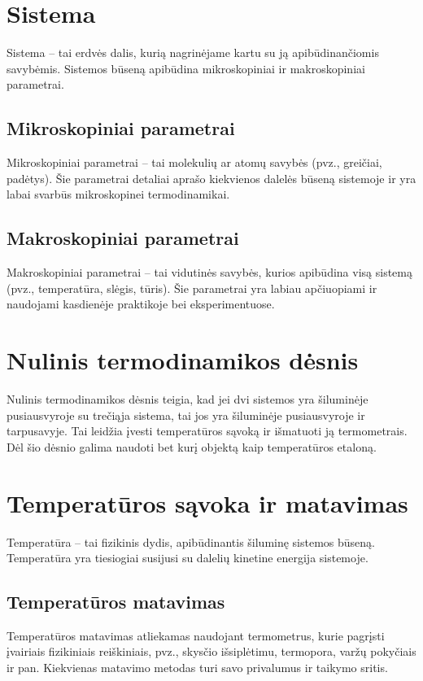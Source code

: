 \documentclass[a4paper,12pt]{article}
\begin{document}
\section{Sistema}

Sistema – tai erdvės dalis, kurią nagrinėjame kartu su ją apibūdinančiomis savybėmis. Sistemos būseną apibūdina mikroskopiniai ir makroskopiniai parametrai.

\subsection{Mikroskopiniai parametrai}
Mikroskopiniai parametrai – tai molekulių ar atomų savybės (pvz., greičiai, padėtys). Šie parametrai detaliai aprašo kiekvienos dalelės būseną sistemoje ir yra labai svarbūs mikroskopinei termodinamikai.

\subsection{Makroskopiniai parametrai}
Makroskopiniai parametrai – tai vidutinės savybės, kurios apibūdina visą sistemą (pvz., temperatūra, slėgis, tūris). Šie parametrai yra labiau apčiuopiami ir naudojami kasdienėje praktikoje bei eksperimentuose.

\section{Nulinis termodinamikos dėsnis}

Nulinis termodinamikos dėsnis teigia, kad jei dvi sistemos yra šiluminėje pusiausvyroje su trečiąja sistema, tai jos yra šiluminėje pusiausvyroje ir tarpusavyje. Tai leidžia įvesti temperatūros sąvoką ir išmatuoti ją termometrais. Dėl šio dėsnio galima naudoti bet kurį objektą kaip temperatūros etaloną.

\section{Temperatūros sąvoka ir matavimas}

Temperatūra – tai fizikinis dydis, apibūdinantis šiluminę sistemos būseną. Temperatūra yra tiesiogiai susijusi su dalelių kinetine energija sistemoje.

\subsection{Temperatūros matavimas}
Temperatūros matavimas atliekamas naudojant termometrus, kurie pagrįsti įvairiais fizikiniais reiškiniais, pvz., skysčio išsiplėtimu, termopora, varžų pokyčiais ir pan. Kiekvienas matavimo metodas turi savo privalumus ir taikymo sritis.
\end{document}
